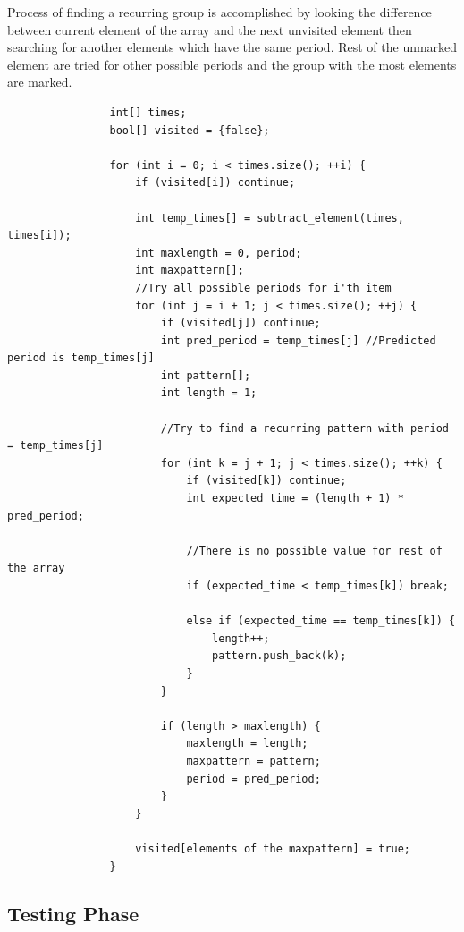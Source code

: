 \documentclass[12pt]{report}
\begin{document}
            Process of finding a recurring group is accomplished by looking the difference between current element of the array and the next unvisited element then searching for another elements which have the same period. Rest of the unmarked element are tried for other possible periods and the group with the most elements are marked.

            \begin{verbatim}
                int[] times;
                bool[] visited = {false};

                for (int i = 0; i < times.size(); ++i) {
                    if (visited[i]) continue;

                    int temp_times[] = subtract_element(times, times[i]);
                    int maxlength = 0, period;
                    int maxpattern[];
                    //Try all possible periods for i'th item
                    for (int j = i + 1; j < times.size(); ++j) { 
                        if (visited[j]) continue;
                        int pred_period = temp_times[j] //Predicted period is temp_times[j]
                        int pattern[];
                        int length = 1;
                        
                        //Try to find a recurring pattern with period = temp_times[j]
                        for (int k = j + 1; j < times.size(); ++k) {
                            if (visited[k]) continue;
                            int expected_time = (length + 1) * pred_period;
                        
                            //There is no possible value for rest of the array
                            if (expected_time < temp_times[k]) break;
                            
                            else if (expected_time == temp_times[k]) {
                                length++;
                                pattern.push_back(k);
                            }
                        }

                        if (length > maxlength) { 
                            maxlength = length; 
                            maxpattern = pattern; 
                            period = pred_period; 
                        }
                    }

                    visited[elements of the maxpattern] = true;
                }
            \end{verbatim}
        \subsection{Testing Phase}
\end{document}
